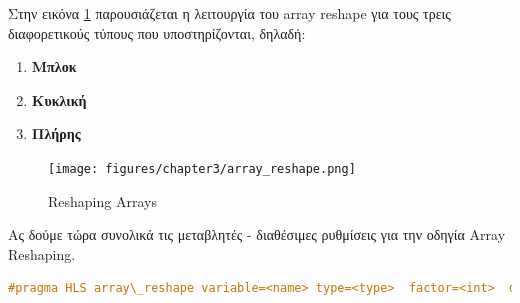 Στην εικόνα \ref{fig:array_reshape} παρουσιάζεται η λειτουργία του array reshape για τους τρεις διαφορετικούς τύπους που υποστηρίζονται, δηλαδή:
\begin{enumerate}
  \item \textbf{Μπλοκ}
  \item \textbf{Κυκλική}
  \item \textbf{Πλήρης}
\end{enumerate}

\begin{figure}[h!]
  \centering
  \texttt{[image: figures/chapter3/array\_reshape.png]}
  \caption{Reshaping Arrays}
  \label{fig:array_reshape}
\end{figure}

Ας δούμε τώρα συνολικά τις μεταβλητές - διαθέσιμες ρυθμίσεις για την οδηγία Array Reshaping.

\begin{lstlisting}[language=C++, caption={Οδηγία Array Reshaping}]
  #pragma HLS array\_reshape variable=<name> type=<type>  factor=<int>  dim=<int> off=true
\end{lstlisting}

